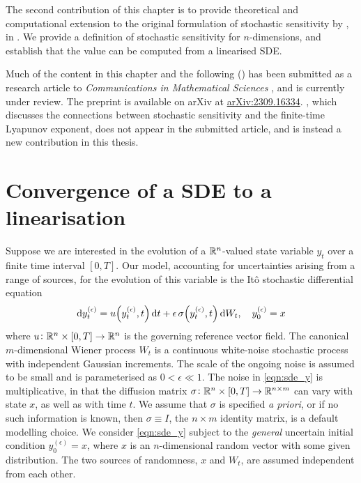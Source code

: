 The second contribution of this chapter is to provide theoretical and computational extension to the original formulation of stochastic sensitivity by \citet{Balasuriya_2020_StochasticSensitivityComputable}, in .
We provide a definition of stochastic sensitivity for \(n\)-dimensions, and establish that the value can be computed from a linearised SDE.


Much of the content in this chapter and the following () has been submitted as a research article to \textit{Communications in Mathematical Sciences} \citep{BlakeEtAl_2023_ConvergenceStochasticDifferential}, and is currently under review.
The preprint is available on arXiv at \href{https://arxiv.org/abs/2309.16334}{arXiv:2309.16334}.
, which discusses the connections between stochastic sensitivity and the finite-time Lyapunov exponent, does not appear in the submitted article, and is instead a new contribution in this thesis.


\section{Convergence of a SDE to a linearisation}\label{sec:theory}
Suppose we are interested in the evolution of a \(\mathbb{R}^n\)-valued state variable \(y_t\) over a finite time interval \([0,T]\).
Our model, accounting for uncertainties arising from a range of sources, for the evolution of this variable is the It\^o stochastic differential equation
\begin{equation}
	\dif y_t^{(\epsilon)} = u\!\left(y_t^{(\epsilon)}, t\right)\dif t + \epsilon \, \sigma\!\left(y_t^{(\epsilon)}, t\right)\dif W_t, \quad y_0^{(\epsilon)} = x
	\label{eqn:sde_y}
\end{equation}
where \(u\colon \mathbb{R}^n \times [0,T] \to \mathbb{R}^n\) is the governing reference vector field.
The canonical \(m\)-dimensional Wiener process \(W_t\)  is a continuous white-noise stochastic process with independent Gaussian increments.
The scale of the ongoing noise is assumed to be small and is parameterised as \(0 < \epsilon \ll 1\).
The noise in \cref{eqn:sde_y} is multiplicative, in that the diffusion matrix \(\sigma\colon \mathbb{R}^n \times [0,T] \to \mathbb{R}^{n\times m}\) can vary with state \( x \), as well as with time \( t \).
We assume that \(\sigma\) is specified \textit{a priori}, or if no such information is known, then \(\sigma \equiv I\), the \(n \times m\) identity matrix, is a default modelling choice.
We consider \cref{eqn:sde_y} subject to the \emph{general} uncertain initial condition \(y_0^{(\epsilon)} = x\), where \(x\) is an \(n\)-dimensional random vector with some given distribution. The two sources of randomness, $ x $ and $ W_t $, are assumed independent from each other.

